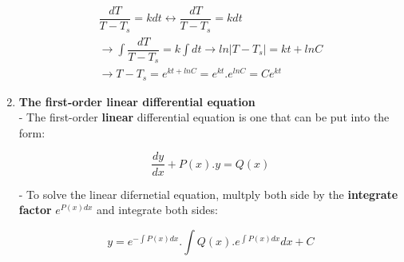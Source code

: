 \documentclass[10pt]{article}
\begin{document}
\begin{enumerate}
\begin{center}
	\begin{align}
	\dfrac{dT}{T-T_s} = kdt \leftrightarrow \dfrac{dT}{T-T_s} = kdt \\
	\rightarrow \displaystyle \int \dfrac{dT}{T-T_s} = k \int dt \rightarrow ln|T-T_s| = kt + lnC \\
	\rightarrow T -T_s = e^{kt + lnC} = e^{kt}.e^{lnC} = Ce^{kt}
	\end{align}
	\end{center}
	\item \textbf{The first-order linear differential equation}\\
	- The first-order \textbf{linear} differential equation is one that can be put into the form:
	\begin{mybox}
	\begin{center}
	\begin{equation}
	\dfrac{dy}{dx} + P(x).y = Q(x)
	\end{equation}
	\end{center}
	\end{mybox}
	- To solve the linear difernetial equation, multply both side by the \textbf{integrate factor} $e^{P(x)dx}$ and integrate both sides:
	\begin{mybox}
	\begin{center}
	\begin{equation}
	y = e^{- \int P(x)dx}.{\displaystyle \int Q(x).e^{\int P(x)dx}dx + C}
	\end{equation}
	\end{center}
	\end{mybox}
\end{enumerate}
\end{document}
